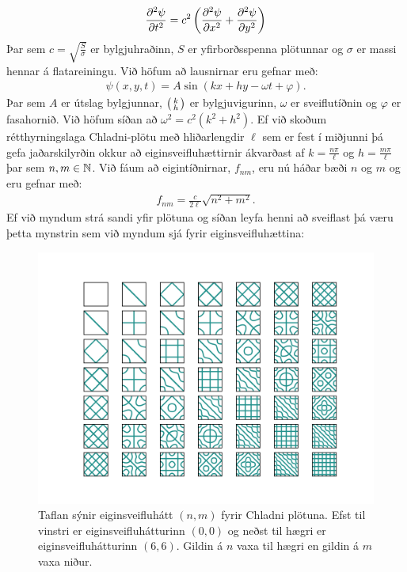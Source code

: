 \ifdefined \wholebook \else\documentclass[oneside]{book}\usepackage{EdlBook}\graphicspath{{figures/}}
\begin{document}
\begin{align*}
    \pdv[2]{\psi}{t} = c^2\left( \pdv[2]{\psi}{x} + \pdv[2]{\psi}{y} \right)
\end{align*}
Þar sem $c = \sqrt{\frac{S}{\sigma}}$ er bylgjuhraðinn, $S$ er yfirborðsspenna plötunnar og $\sigma$ er massi hennar á flatareiningu. Við höfum að lausnirnar eru gefnar með:
\begin{align*}
    \psi(x,y,t) = A\sin( kx + hy - \omega t + \varphi).
\end{align*}
Þar sem $A$ er útslag bylgjunnar, $\smqty(k \\ h)$ er bylgjuvigurinn, $\omega$ er sveiflutíðnin og $\varphi$ er fasahornið. Við höfum síðan að $\omega^2 = c^2\left(k^2 + h^2 \right)$. Ef við skoðum rétthyrningslaga Chladni-plötu með hliðarlengdir $\ell$ sem er fest í miðjunni þá gefa jaðarskilyrðin okkur að eiginsveifluhættirnir ákvarðast af $k = \frac{n\pi}{\ell}$ og $h = \frac{m\pi}{\ell}$ þar sem $n,m \in \mathbb{N}$. Við fáum að eigintíðnirnar, $f_{nm}$, eru nú háðar bæði $n$ og $m$ og eru gefnar með:
\begin{align*}
    f_{nm} = \frac{c}{2\ell} \sqrt{n^2 + m^2}. 
\end{align*}
Ef við myndum strá sandi yfir plötuna og síðan leyfa henni að sveiflast þá væru þetta mynstrin sem við myndum sjá fyrir eiginsveifluhættina:

\begin{figure}[H]
    \centering
    \includegraphics[width = \textwidth]{figures/chlad.png}
    \caption{Taflan sýnir eiginsveifluhátt $(n,m)$ fyrir Chladni plötuna. Efst til vinstri er eiginsveifluhátturinn  $(0,0)$ og neðst til hægri er eiginsveifluhátturinn $(6,6)$. Gildin á $n$ vaxa til hægri en gildin á $m$ vaxa niður.}
    \label{fig:chlad}
\end{figure}
\end{document}
